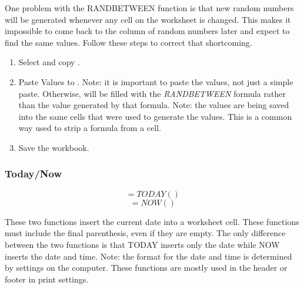 One problem with the RANDBETWEEN function is that new random numbers will be generated whenever any cell on the worksheet is changed. This makes it impossible to come back to the column of random numbers later and expect to find the same values. Follow these steps to correct that shortcoming.

\begin{enumerate}[resume]
	\item Select and copy .
	\item Paste Values to . Note: it is important to paste the values, not just a simple paste. Otherwise,  will be filled with the \textit{RANDBETWEEN} formula rather than the value generated by that formula. Note: the values are being saved into the same cells that were used to generate the values. This is a common way used to strip a formula from a cell.
	\item Save the  workbook.
\end{enumerate}

\subsubsection{Today/Now}

\[ =TODAY() \]
\[ =NOW() \]

These two functions insert the current date into a worksheet cell. These functions must include the final parenthesis, even if they are empty. The only difference between the two functions is that TODAY inserts only the date while NOW inserts the date and time. Note: the format for the date and time is determined by settings on the computer. These functions are mostly used in the header or footer in print settings.

